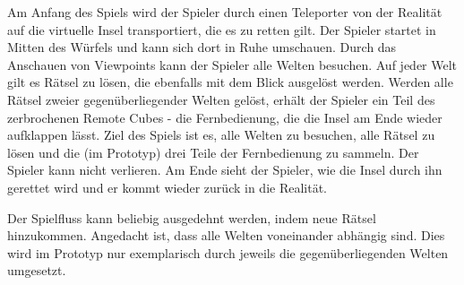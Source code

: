 
Am Anfang des Spiels wird der Spieler durch einen Teleporter von der Realität auf die virtuelle Insel transportiert, die es zu retten gilt. Der Spieler startet in Mitten des Würfels und kann sich dort in Ruhe umschauen. Durch das Anschauen von Viewpoints kann der Spieler alle Welten besuchen. Auf jeder Welt gilt es Rätsel zu lösen, die ebenfalls mit dem Blick ausgelöst werden. Werden alle Rätsel zweier gegenüberliegender Welten gelöst, erhält der Spieler ein Teil des zerbrochenen Remote Cubes - die Fernbedienung, die die Insel am Ende wieder aufklappen lässt.
Ziel des Spiels ist es, alle Welten zu besuchen, alle Rätsel zu lösen und die (im Prototyp) drei Teile der Fernbedienung zu sammeln. 
Der Spieler kann nicht verlieren. Am Ende sieht der Spieler, wie die Insel durch ihn gerettet wird und er kommt wieder zurück in die Realität.

Der Spielfluss kann beliebig ausgedehnt werden, indem neue Rätsel hinzukommen. Angedacht ist, dass alle Welten voneinander abhängig sind. Dies wird im Prototyp nur exemplarisch durch jeweils die gegenüberliegenden Welten umgesetzt.
